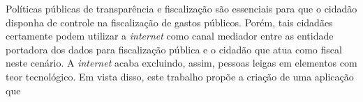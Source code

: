 Políticas públicas de transparência e fiscalização são essenciais para que o cidadão disponha de controle na fiscalização de gastos públicos. Porém, tais cidadães certamente podem utilizar a \textit{internet} como canal mediador entre as entidade portadora dos dados para fiscalização pública e o cidadão que atua como fiscal neste cenário. A \textit{internet} acaba excluindo, assim, pessoas leigas em elementos com teor tecnológico.
Em vista disso, este trabalho propõe a criação de uma aplicação que 

